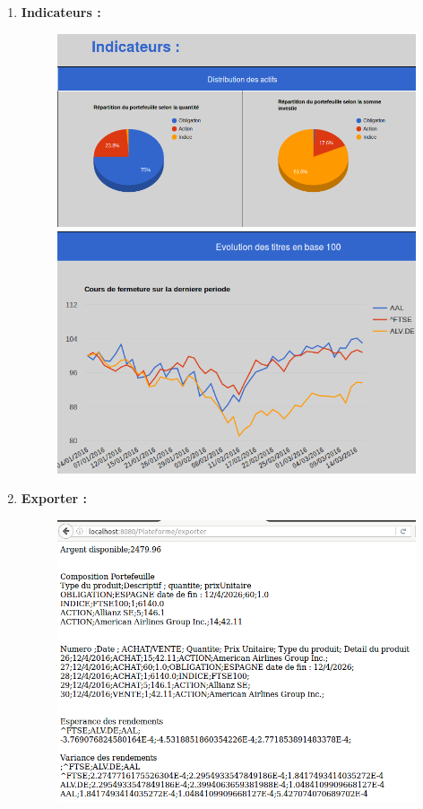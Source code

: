 \begin{enumerate}
      \item \textbf{Indicateurs :}
      \begin{figure}[H]
	\center
	\includegraphics[scale=0.5]{../graph/7-indicateursPtfcamemberts.png}
	\includegraphics[scale=0.5]{../graph/7-indicateursbase100.png}
      \end{figure}

      \item \textbf{Exporter :}
      \begin{figure}[H]
	\center	
	\includegraphics[scale=0.5]{../graph/7-exporterpage.png}
      \end{figure}

    \end{enumerate}
  
